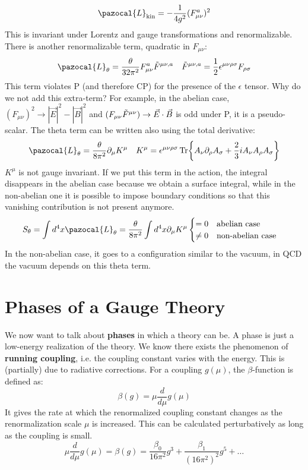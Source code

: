 \documentclass[../main.tex]{subfiles}
\begin{document}
\[
\pazocal{L}_{\text{kin}}=-\frac{1}{4g^2}(F_{\mu\nu}^a)^2
\]
This is invariant under Lorentz and gauge transformations and renormalizable. There is another renormalizable term, quadratic in $F_{\mu\nu}$:
\[
\pazocal{L}_{\theta}=\frac{\theta}{32\pi^2}F_{\mu\nu}^a\Tilde{F}^{\mu\nu,a} \quad \Tilde{F}^{\mu\nu,a}=\frac{1}{2}\epsilon^{\mu\nu\rho\sigma}F_{\rho\sigma}
\]
This term violates P (and therefore CP) for the presence of the $\epsilon$ tensor. Why do we not add this extra-term? For example, in the abelian case, $(F_{\mu\nu})^2\to|\vec{E}|^2-|\vec{B}|^2$ and $(F_{\mu\nu}\Tilde{F}^{\mu\nu})\to\vec{E}\cdot\vec{B}$ is odd under P, it is a pseudo-scalar. The theta term can be written also using the total derivative: 
\[
\pazocal{L}_{\theta}=\frac{\theta}{8\pi^2}\partial_\mu K^\mu \quad K^\mu=\epsilon^{\mu\nu\rho\sigma}\Tr{A_\nu\partial_\rho A_\sigma+\frac{2}{3}iA_\nu A_\rho A_\sigma}
\]
$K^\mu$ is not gauge invariant. If we put this term in the action, the integral disappears in the abelian case because we obtain a surface integral, while in the non-abelian one it is possible to impose boundary conditions so that this vanishing contribution is not present anymore.
\[
S_\theta=\int d^4x\pazocal{L}_\theta=\frac{\theta}{8\pi^2}\int d^4x\partial_\mu K^\mu\begin{cases}
    =0 \quad \text{abelian case}\\
    \neq0 \quad \text{non-abelian case}
\end{cases}
\]
In the non-abelian case, it goes to a configuration similar to the vacuum, in QCD the vacuum depends on this theta term.
\section{Phases of a Gauge Theory}
We now want to talk about \textbf{phases} in which a theory can be. A phase is just a low-energy realization of the theory. We know there exists the phenomenon of \textbf{running coupling}, i.e. the coupling constant varies with the energy. This is (partially) due to radiative corrections. For a coupling $g(\mu)$, the $\beta$-function is defined as:
\[
\beta(g)=\mu\frac{d}{d\mu}g(\mu)
\]
It gives the rate at which the renormalized coupling constant changes as the renormalization scale $\mu$ is increased. This can be calculated perturbatively as long as the coupling is small.
\[
\mu\frac{d}{d\mu}g(\mu)=\beta(g)=\frac{\beta_0}{16\pi^2}g^3+\frac{\beta_1}{(16\pi^2)^2}g^5+\dots
\]
\end{document}

